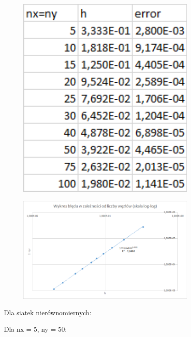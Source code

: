 \begin{figure}[!ht]
	\begin{center}
		\includegraphics[width=0.8\textwidth]{Lab5/charts/zad2/error_dane.png}
	\end{center}
\end{figure}

\begin{figure}[!ht]
	\begin{center}
		\includegraphics[width=0.8\textwidth]{Lab5/charts/zad2/error.png}
	\end{center}
\end{figure}

\newpage

Dla siatek nierównomiernych:

Dla nx = 5, ny = 50:

